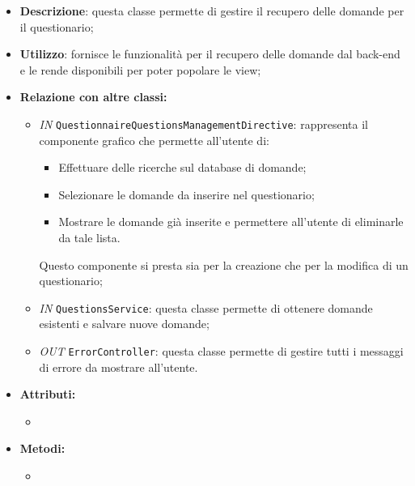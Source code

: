 \begin{itemize}
	\item \textbf{Descrizione}: questa classe permette di gestire il recupero delle domande per il questionario;
	\item \textbf{Utilizzo}: fornisce le funzionalità per il recupero delle domande dal back-end e le rende disponibili per poter popolare le view;
	\item \textbf{Relazione con altre classi:}
	\begin{itemize}
		\item \textit{IN} \texttt{QuestionnaireQuestionsManagementDirective}: rappresenta il componente grafico che permette all'utente di:
		\begin{itemize}
			\item Effettuare delle ricerche sul database di domande;
			\item Selezionare le domande da inserire nel questionario;
			\item Mostrare le domande già inserite e permettere all'utente di eliminarle da tale lista.
		\end{itemize}
		Questo componente si presta sia per la creazione che per la modifica di un questionario;
		\item \textit{IN} \texttt{QuestionsService}: questa classe permette di ottenere domande esistenti e salvare nuove domande;
		\item \textit{OUT} \texttt{ErrorController}: questa classe permette di gestire tutti i messaggi di errore da mostrare all'utente.
	\end{itemize}
	\item \textbf{Attributi:}
	\begin{itemize}
		\item 
	\end{itemize}
	\item \textbf{Metodi:}
	\begin{itemize}
		\item 
	\end{itemize}
\end{itemize}

